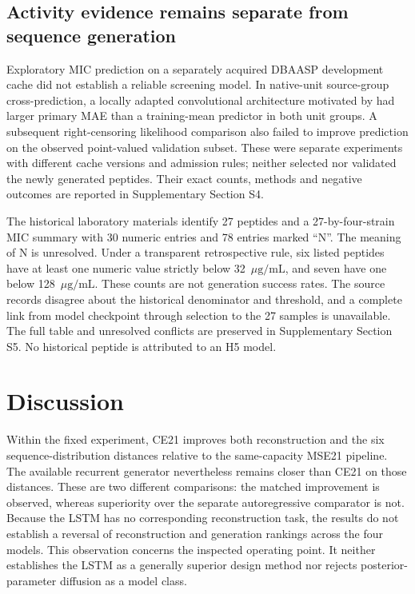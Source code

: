 \documentclass[12pt,a4paper]{article}
\newcommand{\ug}{\ensuremath{\mu\mathrm{g}/\mathrm{mL}}}
\begin{document}
\subsection{Activity evidence remains separate from sequence generation}
Exploratory MIC prediction on a separately acquired DBAASP development cache \citep{pirtskhalava2021} did not establish a reliable screening model. In native-unit source-group cross-prediction, a locally adapted convolutional architecture motivated by \citet{witten2019} had larger primary MAE than a training-mean predictor in both unit groups. A subsequent right-censoring likelihood comparison also failed to improve prediction on the observed point-valued validation subset. These were separate experiments with different cache versions and admission rules; neither selected nor validated the newly generated peptides. Their exact counts, methods and negative outcomes are reported in Supplementary Section S4.

The historical laboratory materials identify 27 peptides and a 27-by-four-strain MIC summary with 30 numeric entries and 78 entries marked ``N''. The meaning of N is unresolved. Under a transparent retrospective rule, six listed peptides have at least one numeric value strictly below 32~\ug, and seven have one below 128~\ug. These counts are not generation success rates. The source records disagree about the historical denominator and threshold, and a complete link from model checkpoint through selection to the 27 samples is unavailable. The full table and unresolved conflicts are preserved in Supplementary Section S5. No historical peptide is attributed to an H5 model.

\section{Discussion}
Within the fixed experiment, CE21 improves both reconstruction and the six sequence-distribution distances relative to the same-capacity MSE21 pipeline. The available recurrent generator nevertheless remains closer than CE21 on those distances. These are two different comparisons: the matched improvement is observed, whereas superiority over the separate autoregressive comparator is not. Because the LSTM has no corresponding reconstruction task, the results do not establish a reversal of reconstruction and generation rankings across the four models. This observation concerns the inspected operating point. It neither establishes the LSTM as a generally superior design method nor rejects posterior-parameter diffusion as a model class.
\end{document}
